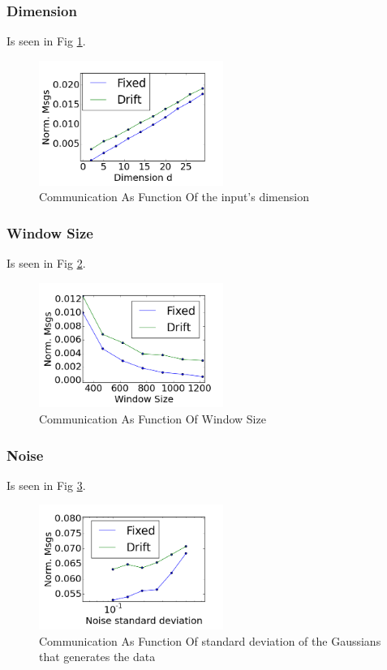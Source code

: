 \documentclass[11pt,twocolumn,varwidth=true,a4paper,fleqn]{article}
\begin{document}
\subsubsection{Dimension}
Is seen in Fig \ref{Dimension}.
	\begin{figure}[h]
	\centering
	\includegraphics[width=60mm]{CommunicationOfFixedVsDrift/Dimension.png}
	\caption{Communication As Function Of the input's dimension}
	\label{Dimension}
	\end{figure}
\subsubsection{Window Size}
Is seen in Fig \ref{WindowSize}.
	\begin{figure}[h]
	\centering
	\includegraphics[width=60mm]{CommunicationOfFixedVsDrift/WindowSize.png}
	\caption{Communication As Function Of Window Size}
	\label{WindowSize}
	\end{figure}
\subsubsection{Noise}
Is seen in Fig \ref{Noise}.
	\begin{figure}[h]
	\centering
	\includegraphics[width=60mm]{CommunicationOfFixedVsDrift/Noise.png}
	\caption{Communication As Function Of standard deviation of the Gaussians that
	generates the data}
	\label{Noise}
	\end{figure}
\end{document}
